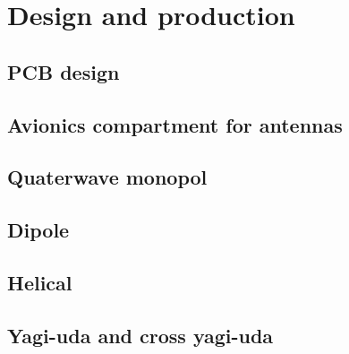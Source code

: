 \chapter{Design and production}
\section{PCB design}
\section{Avionics compartment for antennas}
\section{Quaterwave monopol}
\section{Dipole}
\section{Helical}
\section{Yagi-uda and cross yagi-uda}